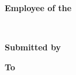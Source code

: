 \documentclass[12pt,a4paper]{article}
\begin{document}
\begin{center}
{\huge\textbf{Employee of the }}\\
\end{center}

\begin{center}
{\large\textbf{}}\\
\end{center}

\begin{center}
{\large\textbf{Submitted by }}\\
\end{center}

\begin{center}
{\large\textbf{To}}\\
\end{center}

\begin{center}
{\Huge\textbf{}}\\
\end{center}
\end{document}
